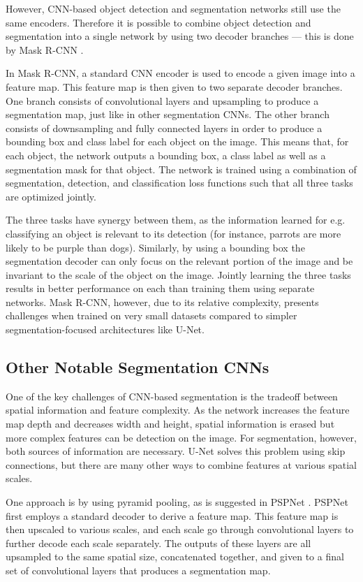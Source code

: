 However, CNN-based object detection and segmentation networks still use the same encoders. Therefore it is possible to combine object detection and segmentation into a single network by using two decoder branches --- this is done by Mask R-CNN \cite{heMaskRCNN2017b}.

In Mask R-CNN, a standard CNN encoder is used to encode a given image into a feature map. This feature map is then given to two separate decoder branches. One branch consists of convolutional layers and upsampling to produce a segmentation map, just like in other segmentation CNNs. The other branch consists of downsampling and fully connected layers in order to produce a bounding box and class label for each object on the image. This means that, for each object, the network outputs a bounding box, a class label as well as a segmentation mask for that object. The network is trained using a combination of segmentation, detection, and classification loss functions such that all three tasks are optimized jointly.

The three tasks have synergy between them, as the information learned for e.g. classifying an object is relevant to its detection (for instance, parrots are more likely to be purple than dogs). Similarly, by using a bounding box the segmentation decoder can only focus on the relevant portion of the image and be invariant to the scale of the object on the image. Jointly learning the three tasks results in better performance on each than training them using separate networks. Mask R-CNN, however, due to its relative complexity, presents challenges when trained on very small datasets compared to simpler segmentation-focused architectures like U-Net.

\subsection{Other Notable Segmentation CNNs}

One of the key challenges of CNN-based segmentation is the tradeoff between spatial information and feature complexity. As the network increases the feature map depth and decreases width and height, spatial information is erased but more complex features can be detection on the image. For segmentation, however, both sources of information are necessary. U-Net solves this problem using skip connections, but there are many other ways to combine features at various spatial scales. 

One approach is by using pyramid pooling, as is suggested in PSPNet \cite{zhao2017pspnet}. PSPNet first employs a standard decoder to derive a feature map. This feature map is then upscaled to various scales, and each scale go through convolutional layers to further decode each scale separately. The outputs of these layers are all upsampled to the same spatial size, concatenated together, and given to a final set of convolutional layers that produces a segmentation map.

